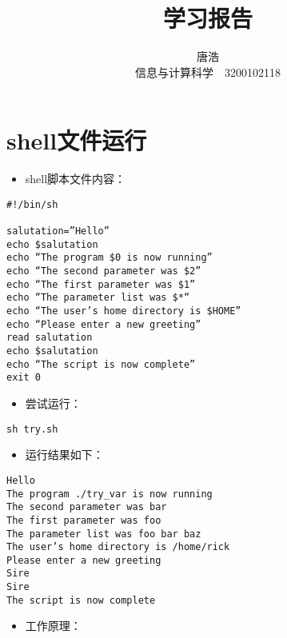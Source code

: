 \documentclass[a4paper]{ctexart}
\title{学习报告}
\author{唐浩 \\ 信息与计算科学　3200102118}
\begin{document}
\maketitle

\pagestyle{empty}

\section{shell文件运行}

\begin{itemize}
\item shell脚本文件内容：
\end{itemize}

\begin{verbatim}
#!/bin/sh

salutation=”Hello”
echo $salutation
echo “The program $0 is now running”
echo “The second parameter was $2”
echo “The first parameter was $1”
echo “The parameter list was $*“
echo “The user’s home directory is $HOME”
echo “Please enter a new greeting”
read salutation
echo $salutation
echo “The script is now complete”
exit 0
\end{verbatim}

\begin{itemize}
  
\item 尝试运行：
  
\end{itemize}

\begin{verbatim}
sh try.sh
\end{verbatim}

\begin{itemize}
  
\item 运行结果如下：
  
\end{itemize}

\begin{verbatim}
Hello
The program ./try_var is now running
The second parameter was bar
The first parameter was foo
The parameter list was foo bar baz
The user’s home directory is /home/rick
Please enter a new greeting
Sire
Sire
The script is now complete
\end{verbatim}


\begin{itemize}
\item 工作原理：
\end{itemize}
\end{document}
